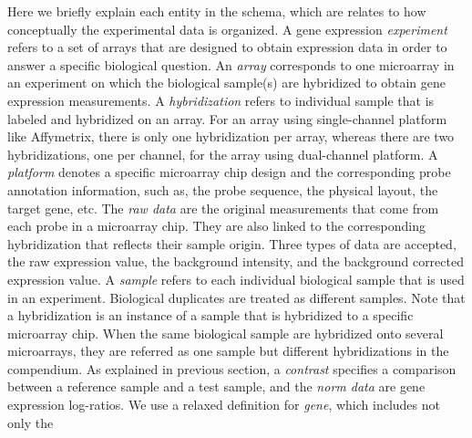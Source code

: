Here we briefly explain each entity in the schema, which are relates to how
conceptually the experimental data is organized.
%
A gene expression \textit{experiment} refers to a set of arrays that are
designed to obtain expression data in order to answer a specific biological
question.
%
An \textit{array} corresponds to one microarray in an experiment on which the
biological sample(s) are hybridized to obtain gene expression measurements.
%
A \textit{hybridization} refers to individual sample that is labeled and
hybridized on an array.
%
For an array using single-channel platform like Affymetrix, there is only one
hybridization per array, whereas there are two hybridizations, one per
channel, for the array using dual-channel platform.
%
A \textit{platform} denotes a specific microarray chip design and the
corresponding probe annotation information, such as, the probe sequence, the
physical layout, the target gene, etc.
%
The \textit{raw data} are the original measurements that come from each probe
in a microarray chip.  They are also linked to the corresponding hybridization
that reflects their sample origin.
%
Three types of data are accepted, the raw expression value, the background
intensity, and the background corrected expression value.
%
% 
%
A \textit{sample} refers to each individual biological sample that is used in
an experiment.  Biological duplicates are treated as different samples.
%
Note that a hybridization is an instance of a sample that is hybridized to a
specific microarray chip.  When the same biological sample are hybridized
onto several microarrays, they are referred as one sample but different
hybridizations in the compendium.
%
%
As explained in previous section, a \textit{contrast} specifies a comparison
between a reference sample and a test sample, and the \textit{norm data} are
gene expression log-ratios.
%
We use a relaxed definition for \textit{gene}, which includes not only the
